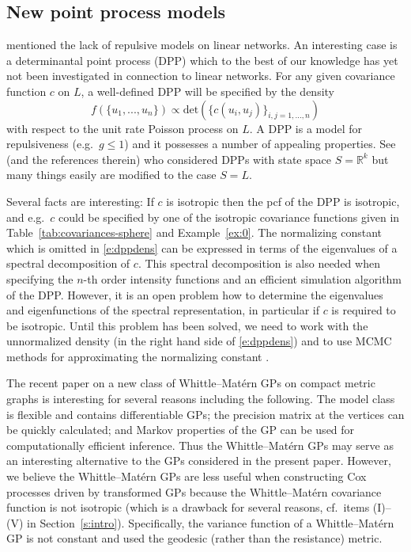 \documentclass[alpha-refs]{wiley-article}
\begin{document}
\subsection{New point process models}\label{s:7.1}

\citet{Stationary} mentioned the lack of repulsive models on linear networks. An interesting case is a determinantal point process (DPP) which to the best of our knowledge has yet not been investigated in connection to linear networks. 
 For any given covariance function $c$ on $L$, a well-defined DPP will be specified by the density 
\begin{equation}\label{e:dppdens}
f(\{u_1,...,u_n\})\propto \mathrm{det}\left(\{c(u_i,u_j)\}_{i,j=1,...,n}\right)
\end{equation}
with respect to the unit rate Poisson process on $L$. A DPP is a model for repulsiveness (e.g.\ $g\le1$) and it {possesses} a number of appealing properties.
See
\citet{FredEtAl} (and the references therein) who considered DPPs with state space $S=\mathbb R^k$ but many things easily are modified to the case $S=L$. 

Several facts are interesting: If $c$ is isotropic then the pcf of the DPP is isotropic, and e.g.\ 
$c$ could be specified by one of 
the isotropic covariance functions given in Table~\ref{tab:covariances-sphere} and Example~\ref{ex:0}. 
The normalizing constant which is omitted in \eqref{e:dppdens} can be expressed in terms of the eigenvalues of a spectral decomposition of $c$. This spectral decomposition is also needed when specifying the $n$-th order intensity functions and an efficient simulation algorithm of the DPP.  However, it is an open problem how to determine the eigenvalues and eigenfunctions of the spectral representation, in particular if $c$ is required to be isotropic. Until this problem has been solved, we need to work with the unnormalized density (in the right hand side of \eqref{e:dppdens}) and to use MCMC methods for approximating the normalizing constant \citep{Geyer,MW04}.

The recent paper \citet{BSW} on a new class of Whittle–Mat{\'e}rn GPs on compact metric graphs is interesting for several reasons including the following. 
The model class is flexible and contains differentiable GPs; the precision matrix at the vertices can be quickly calculated; and
Markov properties of the GP can be used for computationally efficient inference. Thus the Whittle–Mat{\'e}rn GPs may 
 serve as an interesting alternative to the GPs considered in the present paper. However, we believe the Whittle–Mat{\'e}rn GPs  are less useful 
 when constructing Cox processes driven by transformed GPs because the
Whittle–Mat{\'e}rn covariance function is not isotropic (which is a drawback for several reasons, cf.\ items (I)--(V) in Section~\ref{s:intro}).   Specifically, the variance function of a Whittle–Mat{\'e}rn GP is not constant and \citet{BSW}
 used 
  the geodesic (rather than the resistance) metric. 
\end{document}
